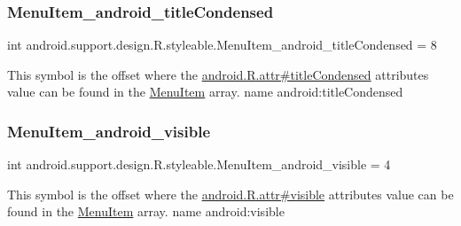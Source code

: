 \subsubsection{\texorpdfstring{Menu\+Item\+\_\+android\+\_\+title\+Condensed}{MenuItem\_android\_titleCondensed}}
{\footnotesize\ttfamily int android.\+support.\+design.\+R.\+styleable.\+Menu\+Item\+\_\+android\+\_\+title\+Condensed = 8\hspace{0.3cm}{\ttfamily [static]}}

This symbol is the offset where the \hyperlink{}{android.\+R.\+attr\#title\+Condensed} attribute\textquotesingle{}s value can be found in the \hyperlink{classandroid_1_1support_1_1design_1_1R_1_1styleable_a4c90afdbb461f2bfba191da26fbc881c}{Menu\+Item} array.  name android\+:title\+Condensed \mbox{\label{classandroid_1_1support_1_1design_1_1R_1_1styleable_af825b4c38a96b3cba91a45cd9f65e9f9}} 
\subsubsection{\texorpdfstring{Menu\+Item\+\_\+android\+\_\+visible}{MenuItem\_android\_visible}}
{\footnotesize\ttfamily int android.\+support.\+design.\+R.\+styleable.\+Menu\+Item\+\_\+android\+\_\+visible = 4\hspace{0.3cm}{\ttfamily [static]}}

This symbol is the offset where the \hyperlink{}{android.\+R.\+attr\#visible} attribute\textquotesingle{}s value can be found in the \hyperlink{classandroid_1_1support_1_1design_1_1R_1_1styleable_a4c90afdbb461f2bfba191da26fbc881c}{Menu\+Item} array.  name android\+:visible \mbox{\label{classandroid_1_1support_1_1design_1_1R_1_1styleable_ab142dfa8fe8f756ee789d58e501b7c1b}} 
